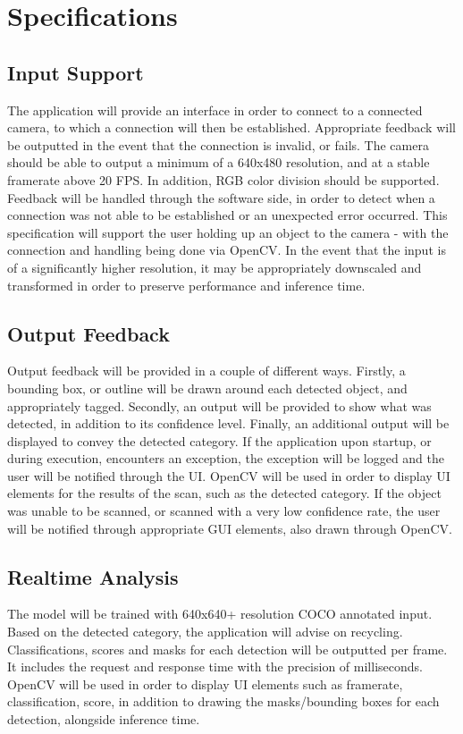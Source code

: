 \documentclass[conference]{IEEEtran}
\begin{document}
\section{Specifications}
\subsection{Input Support}
The application will provide an interface in order to connect to a connected camera, to which a connection will then be established. Appropriate feedback will be outputted in the event that the connection is invalid, or fails.
\newline
The camera should be able to output a minimum of a 640x480 resolution, and at a stable framerate above 20 FPS. In addition, RGB color division should be supported. Feedback will be handled through the software side, in order to detect when a connection was not able to be established or an unexpected error occurred.
\newline
This specification will support the user holding up an object to the camera - with the connection and handling being done via OpenCV. In the event that the input is of a significantly higher resolution, it may be appropriately downscaled and transformed in order to preserve performance and inference time. 

\subsection{Output Feedback}
Output feedback will be provided in a couple of different ways. Firstly, a bounding box, or outline will be drawn around each detected object, and appropriately tagged. Secondly, an output will be provided to show what was detected, in addition to its confidence level. Finally, an additional output will be displayed to convey the detected category.
\newline
If the application upon startup, or during execution, encounters an exception, the exception will be logged and the user will be notified through the UI. OpenCV will be used in order to display UI elements for the results of the scan, such as the detected category.
If the object was unable to be scanned, or scanned with a very low confidence rate, the user will be notified through appropriate GUI elements, also drawn through OpenCV.

\subsection{Realtime Analysis}
The model will be trained with 640x640+ resolution COCO annotated input. Based on the detected category, the application will advise on recycling. Classifications, scores and masks for each detection will be outputted per frame. It includes the request and response time with the precision of milliseconds. 
\newline
OpenCV will be used in order to display UI elements such as framerate, classification, score, in addition to drawing the masks/bounding boxes for each detection, alongside inference time.
\end{document}
